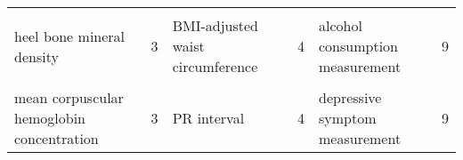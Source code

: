 \begin{table}[H]
{\begin{tabular}[t]{lrlrlr}
\cellcolor{gray!6}{gout} & \cellcolor{gray!6}{3} & \cellcolor{gray!6}{Abnormality of refraction} & \cellcolor{gray!6}{4} & \cellcolor{gray!6}{DNA methylation} & \cellcolor{gray!6}{9}\\
heel bone mineral density & 3 & BMI-adjusted waist circumference & 4 & alcohol consumption measurement & 9\\
\cellcolor{gray!6}{mean corpuscular hemoglobin} & \cellcolor{gray!6}{3} & \cellcolor{gray!6}{FEV/FEC ratio} & \cellcolor{gray!6}{4} & \cellcolor{gray!6}{chronic kidney disease} & \cellcolor{gray!6}{9}\\
mean corpuscular hemoglobin concentration & 3 & PR interval & 4 & depressive symptom measurement & 9\\
\bottomrule
\end{tabular}}
\end{table}
